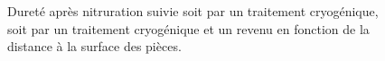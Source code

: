 \begin{figure}[!b]
  \centering
  \hfill
  
  \caption{\label{fig:hardness_nitriding}Dureté après nitruration suivie soit par un traitement cryogénique, soit par un traitement cryogénique et un revenu en fonction de la distance à la surface des pièces.}
\end{figure}

